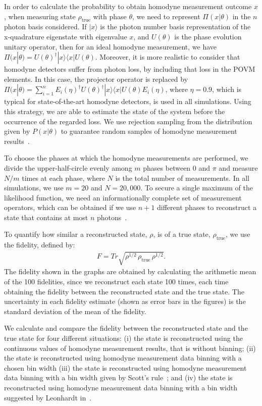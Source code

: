 \documentclass[
reprint,
superscriptaddress,
showpacs,
amsmath,
amssymb,
aps,
pra,
longbibliography
]{revtex4-1}
\begin{document}
In order to calculate the probability to obtain homodyne measurement outcome $x$, when measuring state $\rho_{\mathrm{true}}$ with phase $\theta$, we need to represent $\Pi (x|\theta)$ in the $n$ photon basis considered. If $|x\rangle$ is the photon number basis representation of the x-quadrature eigenstate with eigenvalue $x$, and $U(\theta)$ is the phase evolution unitary operator, then for an ideal homodyne measurement, we have $\Pi (x|\theta) = U(\theta)^{\dagger}|x\rangle \langle x| U(\theta)$. Moreover, it is more realistic to consider that homodyne detectors suffer from photon loss, by including that loss in the POVM elements. In this case, the projector operator is replaced by $\Pi (x|\theta) = \sum_{i=1}^{n} E_i(\eta)^{\dagger} U(\theta)^{\dagger}|x\rangle \langle x| U(\theta) E_i(\eta)$, where $\eta = 0.9$, which is typical for state-of-the-art homodyne detectors, is used in all
simulations. Using this strategy, we are able to estimate the state of the system before the occurrence of the regarded loss. We use rejection
sampling from the distribution given by $P(x|\theta)$ to guarantee random samples of homodyne measurement results~\cite{Kennedy1980}.

To choose the phases at which the homodyne measurements are performed, we divide the upper-half-circle evenly among $m$ phases between 0 and $\pi$ and measure $N/m$ times at each phase, where $N$ is the total number of measurements. In all simulations, we use $m=20$ and $N = 20,000$. To secure a single maximum of the likelihood function, we need an informationally complete set of measurement operators, which can be obtained if we use $n+1$ different phases to reconstruct a state that contains at most $n$ photons~\cite{Leonhardt1997}. 

To quantify how similar a reconstructed state, $\rho$, is of a true state, $\rho_{\mathrm{true}}$, we use the fidelity, defined by:
\begin{eqnarray}
F = Tr \sqrt{\rho^{1/2}\, \rho_{\mathrm{true}} \, \rho^{1/2}}.
\end{eqnarray}  
The fidelity shown in the graphs are obtained by calculating the arithmetic mean of the 100 fidelities, since we reconstruct each state 100 times, each time obtaining the fidelity between the reconstructed state and the true state. The uncertainty in each fidelity estimate (shown as error bars in the figures) is the standard deviation of the mean of the fidelity.

We calculate and compare the fidelity between the reconstructed state and the true state for four different situations: (i) the state is reconstructed using the continuous values of homodyne measurement results, that is without binning; (ii) the state is reconstructed using homodyne measurement data binning with a chosen bin width (iii) the state is reconstructed using homodyne measurement data binning with a bin width given by Scott's rule~\cite{Scott2010}; and (iv) the state is reconstructed using homodyne measurement data binning with a bin width suggested by Leonhardt in~\cite{Leonhardt1997}.
\end{document}
